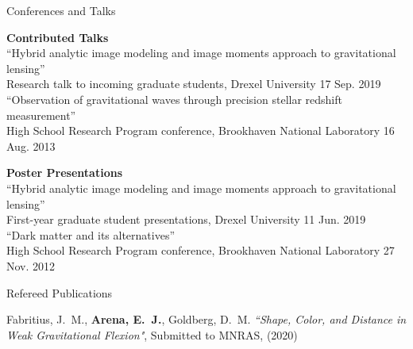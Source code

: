 \documentclass{resume} %
\newcommand{\forceindent}{\leavevmode{\parindent=1em\indent}}
\begin{document}
\begin{rSection}{Conferences and Talks}

\textbf{Contributed Talks}\\
``Hybrid analytic image modeling and image moments approach to gravitational lensing''\\
\forceindent Research talk to incoming graduate students, Drexel University \hfill 17 Sep. 2019\\
``Observation of gravitational waves through precision stellar redshift measurement''\\
\forceindent High School Research Program conference, Brookhaven National Laboratory \hfill 16 Aug. 2013

\textbf{Poster Presentations}\\
``Hybrid analytic image modeling and image moments approach to gravitational lensing''\\
\forceindent First-year graduate student presentations, Drexel University \hfill 11 Jun. 2019\\
``Dark matter and its alternatives''\\
\forceindent High School Research Program conference, Brookhaven National Laboratory \hfill 27 Nov. 2012

\end{rSection}



\begin{rSection}{Refereed Publications}

\begin{etaremune}
\item {Fabritius}, J.~M., \textbf{{Arena}, E.~J.}, {Goldberg}, D.~M. \textit{``Shape, Color, and Distance in Weak Gravitational Flexion"}, Submitted to MNRAS, (2020)
\end{etaremune}

\end{rSection}

\end{document}
